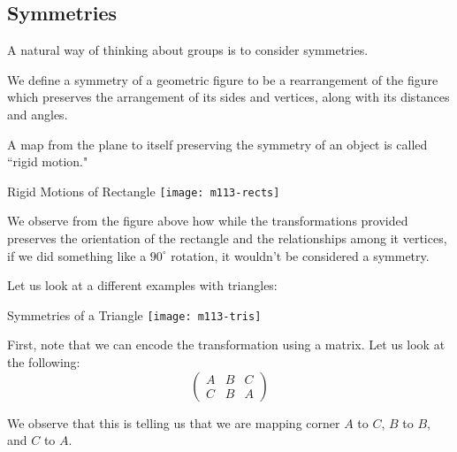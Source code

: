 \documentclass[openany]{book}
\begin{document}
\subsection{Symmetries}
A natural way of thinking about groups is to consider symmetries.

\begin{defn}[Symmetry]
	We define a symmetry of a geometric figure to be a rearrangement of the figure which preserves the arrangement of its sides and vertices, along with its distances and angles.
\end{defn}

\begin{defn}
	A map from the plane to itself preserving the symmetry of an object is called ``rigid motion."
\end{defn}
\newpage
\begin{figurebox}[]{Rigid Motions of Rectangle}
	\centering\texttt{[image: m113-rects]}
\end{figurebox}

We observe from the figure above how while the transformations provided preserves the orientation of the rectangle and the relationships among it vertices, if we did something like a $90^{\circ}$ rotation, it wouldn't be considered a symmetry.

Let us look at a different examples with triangles:

\begin{figurebox}[]{Symmetries of a Triangle}
	\centering\texttt{[image: m113-tris]}
\end{figurebox}

First, note that we can encode the transformation using a matrix. Let us look at the following:
\begin{equation*}
	\begin{pmatrix}
		A & B & C \\ C & B & A
	\end{pmatrix}
\end{equation*}

We observe that this is telling us that we are mapping corner $A$ to $C$, $B$ to $B$, and $C$ to $A$.
\end{document}
